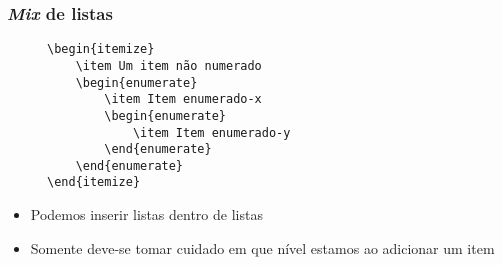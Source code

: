 \begin{frame}[fragile] \frametitle{\textit{Mix} de listas}
\begin{figure}[!t]
\begin{lstlisting}
\begin{itemize}
	\item Um item não numerado
	\begin{enumerate}
		\item Item enumerado-x
		\begin{enumerate}
			\item Item enumerado-y
		\end{enumerate}
	\end{enumerate}
\end{itemize}
\end{lstlisting}
\end{figure}

\begin{itemize}
	\item Podemos inserir listas dentro de listas
	\item Somente deve-se tomar cuidado em que nível estamos ao adicionar um item
\end{itemize}
\end{frame}